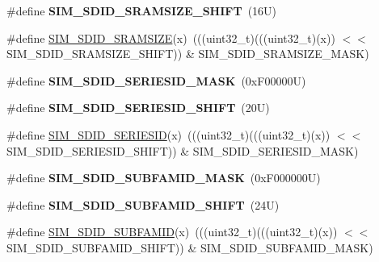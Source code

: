 \begin{DoxyCompactItemize}
\mbox{\label{group___s_i_m___register___masks_ga096c5cec8db3701100c59233e3db0584}} 
\#define {\bfseries S\+I\+M\+\_\+\+S\+D\+I\+D\+\_\+\+S\+R\+A\+M\+S\+I\+Z\+E\+\_\+\+S\+H\+I\+FT}~(16\+U)
\item 
\#define \mbox{\hyperlink{group___s_i_m___register___masks_ga35d378159b24a0e0cc4ac842e0510ee9}{S\+I\+M\+\_\+\+S\+D\+I\+D\+\_\+\+S\+R\+A\+M\+S\+I\+ZE}}(x)~(((uint32\+\_\+t)(((uint32\+\_\+t)(x)) $<$$<$ S\+I\+M\+\_\+\+S\+D\+I\+D\+\_\+\+S\+R\+A\+M\+S\+I\+Z\+E\+\_\+\+S\+H\+I\+FT)) \& S\+I\+M\+\_\+\+S\+D\+I\+D\+\_\+\+S\+R\+A\+M\+S\+I\+Z\+E\+\_\+\+M\+A\+SK)
\item 
\mbox{\label{group___s_i_m___register___masks_ga014f6aec38e92afbd07904db6ed617d0}} 
\#define {\bfseries S\+I\+M\+\_\+\+S\+D\+I\+D\+\_\+\+S\+E\+R\+I\+E\+S\+I\+D\+\_\+\+M\+A\+SK}~(0x\+F00000\+U)
\item 
\mbox{\label{group___s_i_m___register___masks_ga47e31524526fda3e3058a55da89d098b}} 
\#define {\bfseries S\+I\+M\+\_\+\+S\+D\+I\+D\+\_\+\+S\+E\+R\+I\+E\+S\+I\+D\+\_\+\+S\+H\+I\+FT}~(20\+U)
\item 
\#define \mbox{\hyperlink{group___s_i_m___register___masks_gaef9ed54f0f9c0105ed9e07608e9a5f69}{S\+I\+M\+\_\+\+S\+D\+I\+D\+\_\+\+S\+E\+R\+I\+E\+S\+ID}}(x)~(((uint32\+\_\+t)(((uint32\+\_\+t)(x)) $<$$<$ S\+I\+M\+\_\+\+S\+D\+I\+D\+\_\+\+S\+E\+R\+I\+E\+S\+I\+D\+\_\+\+S\+H\+I\+FT)) \& S\+I\+M\+\_\+\+S\+D\+I\+D\+\_\+\+S\+E\+R\+I\+E\+S\+I\+D\+\_\+\+M\+A\+SK)
\item 
\mbox{\label{group___s_i_m___register___masks_ga530d8fe59d2589cf56c00456e89487aa}} 
\#define {\bfseries S\+I\+M\+\_\+\+S\+D\+I\+D\+\_\+\+S\+U\+B\+F\+A\+M\+I\+D\+\_\+\+M\+A\+SK}~(0x\+F000000\+U)
\item 
\mbox{\label{group___s_i_m___register___masks_ga5e40d63bf136287a591bb4fa0b019aba}} 
\#define {\bfseries S\+I\+M\+\_\+\+S\+D\+I\+D\+\_\+\+S\+U\+B\+F\+A\+M\+I\+D\+\_\+\+S\+H\+I\+FT}~(24\+U)
\item 
\#define \mbox{\hyperlink{group___s_i_m___register___masks_gaba1b690ef87b8401c561fdb1ac2248f0}{S\+I\+M\+\_\+\+S\+D\+I\+D\+\_\+\+S\+U\+B\+F\+A\+M\+ID}}(x)~(((uint32\+\_\+t)(((uint32\+\_\+t)(x)) $<$$<$ S\+I\+M\+\_\+\+S\+D\+I\+D\+\_\+\+S\+U\+B\+F\+A\+M\+I\+D\+\_\+\+S\+H\+I\+FT)) \& S\+I\+M\+\_\+\+S\+D\+I\+D\+\_\+\+S\+U\+B\+F\+A\+M\+I\+D\+\_\+\+M\+A\+SK)
$$
\end{DoxyCompactItemize}
